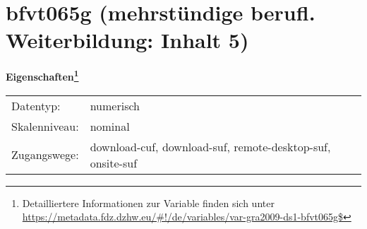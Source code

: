 
    \setcounter{footnote}{0}

    \vspace*{-1.8cm}
	\section{bfvt065g (mehrstündige berufl. Weiterbildung: Inhalt 5)}
	\label{section:bfvt065g}



    \vspace*{0.5cm}
    \noindent\textbf{Eigenschaften\footnote{Detailliertere Informationen zur Variable finden sich unter
		\url{https://metadata.fdz.dzhw.eu/\#!/de/variables/var-gra2009-ds1-bfvt065g$}}}\\
	\begin{tabularx}{\hsize}{@{}lX}
	Datentyp: & numerisch \\
	Skalenniveau: & nominal \\
	Zugangswege: &
	  download-cuf, 
	  download-suf, 
	  remote-desktop-suf, 
	  onsite-suf
 \\
    \end{tabularx}




